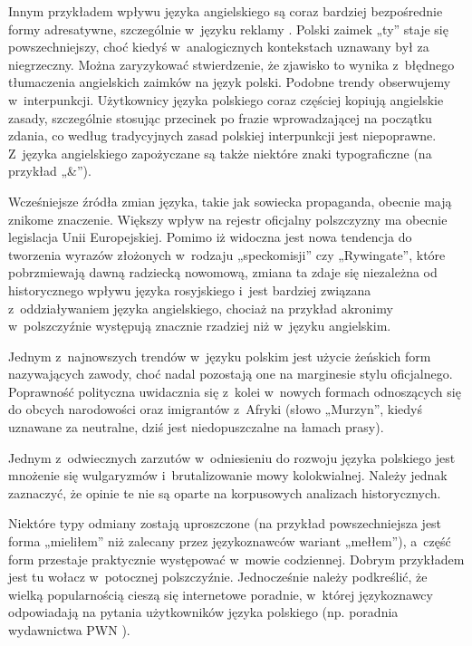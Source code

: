 \begin{multicols}{2}
Innym przykładem wpływu języka angielskiego są coraz bardziej
bezpośrednie formy adresatywne, szczególnie w~języku reklamy
\cite{Chlopicki2000}. Polski zaimek „ty” staje się
powszechniejszy, choć kiedyś w~analogicznych kontekstach uznawany
był za niegrzeczny. Można zaryzykować stwierdzenie, że zjawisko to
wynika z~błędnego tłumaczenia angielskich zaimków na język
polski. Podobne trendy obserwujemy w~interpunkcji. Użytkownicy
języka polskiego coraz częściej kopiują angielskie zasady,
szczególnie stosując przecinek po frazie wprowadzającej na
początku zdania, co według tradycyjnych zasad polskiej interpunkcji
jest niepoprawne. Z~języka angielskiego zapożyczane są także
niektóre znaki typograficzne (na przykład „\&”). 

Wcześniejsze źródła zmian języka, takie jak sowiecka propaganda,
obecnie mają znikome znaczenie. Większy wpływ na rejestr oficjalny
polszczyzny ma obecnie legislacja Unii Europejskiej. Pomimo iż
widoczna jest nowa tendencja do tworzenia wyrazów złożonych
w~rodzaju „speckomisji” czy „Rywingate”, które pobrzmiewają
dawną radziecką nowomową, zmiana ta zdaje się niezależna od
historycznego wpływu języka rosyjskiego i~jest bardziej związana
z~oddziaływaniem języka angielskiego, chociaż na przykład akronimy
w~polszczyźnie występują znacznie rzadziej niż w~języku
angielskim. 


Jednym z~najnowszych trendów w~języku polskim jest użycie
żeńskich form nazywających zawody, choć nadal pozostają one na
marginesie stylu oficjalnego. Poprawność polityczna uwidacznia się
z~kolei w~nowych formach odnoszących się do obcych narodowości oraz
imigrantów z~Afryki (słowo „Murzyn”, kiedyś uznawane za
neutralne, dziś jest niedopuszczalne na łamach prasy). 

Jednym z~odwiecznych zarzutów w~odniesieniu do rozwoju języka
polskiego jest mnożenie się wulgaryzmów i~brutalizowanie mowy
kolokwialnej. Należy jednak zaznaczyć, że opinie te nie są oparte
na korpusowych analizach historycznych. 

Niektóre typy odmiany zostają uproszczone (na przykład
powszechniejsza jest forma „mieliłem” niż zalecany przez
językoznawców wariant „mełłem”), a~część form przestaje
praktycznie występować w~mowie codziennej. Dobrym przykładem jest
tu wołacz w~potocznej polszczyźnie. Jednocześnie należy
podkreślić, że wielką popularnością cieszą się internetowe
poradnie, w~której językoznawcy odpowiadają na pytania
użytkowników języka polskiego (np. poradnia wydawnictwa PWN \cite{poradniapwn}). 


\end{multicols}

